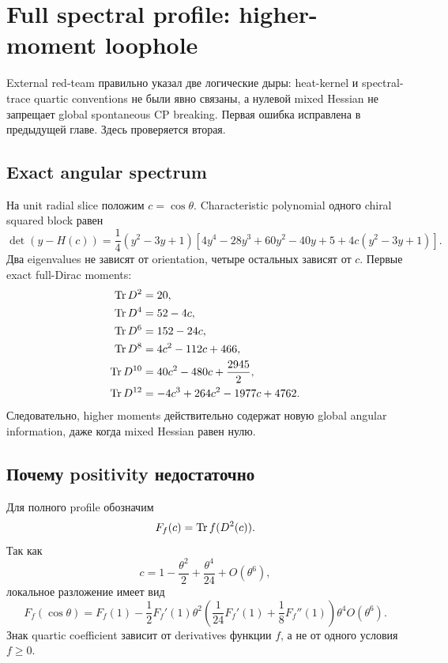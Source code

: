 \chapter{Full spectral profile: higher-moment loophole}

External red-team правильно указал две логические дыры: heat-kernel и
spectral-trace quartic conventions не были явно связаны, а нулевой mixed
Hessian не запрещает global spontaneous CP breaking. Первая ошибка исправлена
в предыдущей главе. Здесь проверяется вторая.

\section{Exact angular spectrum}

На unit radial slice положим $c=\cos\theta$. Characteristic polynomial одного
chiral squared block равен
\begin{equation}
 \det(y-H(c))
 =\frac14(y^2-3y+1)
 \left[
 4y^4-28y^3+60y^2-40y+5
 +4c(y^2-3y+1)
 \right].
\end{equation}
Два eigenvalues не зависят от orientation, четыре остальных зависят от $c$.
Первые exact full-Dirac moments:
\begin{align}
 \operatorname{Tr} D^2&=20,\\
 \operatorname{Tr} D^4&=52-4c,\\
 \operatorname{Tr} D^6&=152-24c,\\
 \operatorname{Tr} D^8&=4c^2-112c+466,\\
 \operatorname{Tr} D^{10}&=40c^2-480c+\frac{2945}{2},\\
 \operatorname{Tr} D^{12}&=-4c^3+264c^2-1977c+4762.
\end{align}
Следовательно, higher moments действительно содержат новую global angular
information, даже когда mixed Hessian равен нулю.

\section{Почему positivity недостаточно}

Для полного profile обозначим
\begin{equation}
 F_f(c)=\operatorname{Tr} f(D^2(c)).
\end{equation}
Так как
\begin{equation}
 c=1-\frac{\theta^2}{2}+\frac{\theta^4}{24}+O(\theta^6),
\end{equation}
локальное разложение имеет вид
\begin{equation}
 F_f(\cos\theta)
 =F_f(1)-\frac12F_f'(1)\theta^2
 \left(\frac1{24}F_f'(1)+\frac18F_f''(1)\right)\theta^4
O(\theta^6).
\end{equation}
Знак quartic coefficient зависит от derivatives функции $f$, а не от одного
условия $f\ge0$.

